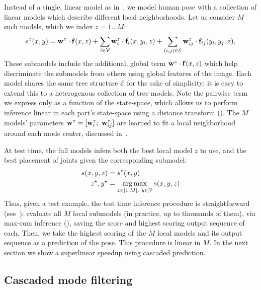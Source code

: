 Instead of a single, linear model as in~, we model human pose 
with a collection of linear models which describe different local 
neighborhoods.  Let us consider $M$ such models, which we index $z = 1 \ldots 
M$:
\begin{align}
s^z(x,y) = \mathbf{w}^z \cdot \mathbf{f}(x,z) +  \sum_{i \in \mathcal{V}} \mathbf{w}^z_i \cdot \mathbf{f}_i(x,y_i,z) + 
\sum_{(i,j) \in \mathcal{E}} \mathbf{w}^z_{ij} \cdot \mathbf{f}_{ij}(y_i,y_j,z),
\end{align}
These submodels include the additional, global term $\mathbf{w}^z \cdot \mathbf{f}(x,z)$ which 
help discriminate the submodels from others using global features of the image.  
Each model shares the same tree structure $\mathcal{E}$ for the sake of 
simplicity; it is easy to extend this to a heterogenous collection of tree 
models.  Note the pairwise term we express only as a function of the 
state-space, which allows us to perform inference linear in each part's 
state-space using a distance transform ().  The $M$ models' 
parameters $\mathbf{w}^z = [\mathbf{w}^z_i;~\mathbf{w}^z_{ij}]$ are learned to fit a local neighborhood 
around each mode center, discussed in~.

At test time, the full \LLPS models infers both the best local model $z$ to 
use, and the best placement of joints given the corresponding submodel:
\begin{align}
s(x,y,z) &= s^z(x,y) \\
z^\star,y^\star &= \mathop{\arg\max}_{z \in [1,M],~y \in \mathcal{Y}} s(x,y,z) 
\end{align}
Thus, given a test example, the test time inference procedure is 
straightforward (see~): evaluate all $M$ local submodels 
(in practice, up to thousands of them), via max-sum inference 
(), saving the score and highest scoring output sequence of 
each.  Then, we take the highest scoring of the $M$ local models and its output 
sequence as a prediction of the pose.  This procedure is linear in $M$.  In the 
next section we show a superlinear speedup using cascaded prediction.

\subsection{Cascaded mode filtering}

